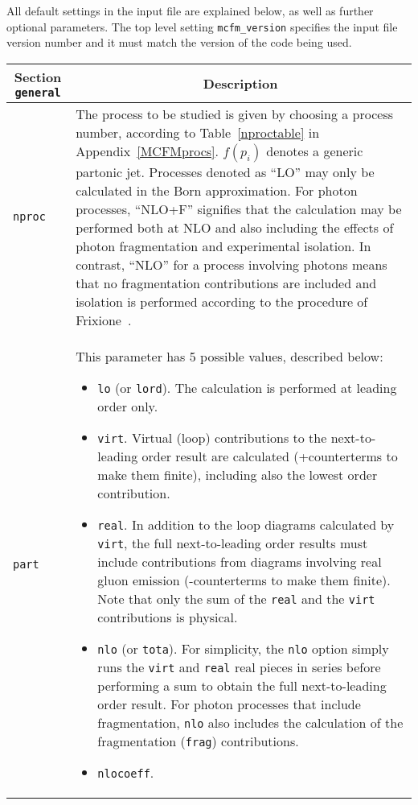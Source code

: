 All default settings in the input file are explained below, as well as further optional parameters.
The top level setting \texttt{mcfm\_version} specifies the input file version number and it must  match the version of 
the code being used.

	\begin{longtable}{p{1.5cm}p{12cm}}
		\toprule
		\multicolumn{1}{c}{{\textbf{Section} \texttt{general}}} & \multicolumn{1}{c}{{\textbf{Description}}} \\ 
		\midrule
		\texttt{nproc} & 
		The process to be studied is given by
		choosing a process number, according to Table~\ref{nproctable}
		in Appendix~\ref{MCFMprocs}.
		$f(p_i)$ denotes a generic partonic jet. Processes denoted as
		``LO'' may only be calculated in the Born approximation. For photon
		processes, ``NLO+F'' signifies that the calculation may be performed
		both at NLO and also including the effects of photon fragmentation
		and experimental isolation. In contrast, ``NLO'' for a process involving
		photons means that no fragmentation contributions are included and isolation
		is performed according to the procedure of Frixione~\cite{Frixione:1998jh}.	\\
		\texttt{part} &
		This parameter has 5 possible values, described below:
		\begin{itemize}
			\item {\tt lo} (or {\tt lord}).
			The calculation is performed at leading order only.
			\item {\tt virt}.
			Virtual (loop) contributions to the next-to-leading order result are
			calculated (+counterterms to make them finite), including also the
			lowest order contribution.
			\item {\tt real}.
			In addition to the loop diagrams calculated by {\tt virt}, the full
			next-to-leading order results must include contributions from diagrams
			involving real gluon emission (-counterterms to make them finite).
			Note that only the sum of the {\tt real} and the {\tt virt} contributions
			is physical.
			\item {\tt nlo} (or {\tt tota}).
			For simplicity, the {\tt nlo} option simply runs the {\tt virt} and
			{\tt real} real pieces in series before performing a sum to obtain
			the full next-to-leading order result. For photon processes that include fragmentation,
			{\tt nlo} also includes the calculation of the fragmentation ({\tt frag})
			contributions.
			\item {\tt nlocoeff}.

\end{itemize}
\end{longtable}
